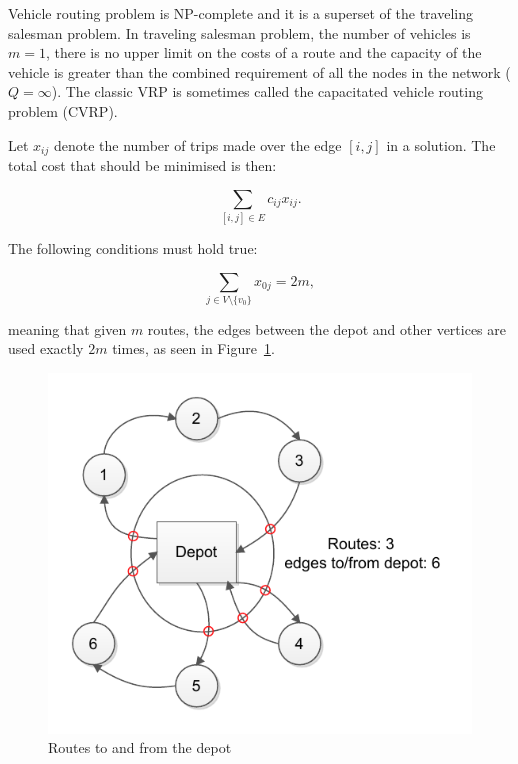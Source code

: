 Vehicle routing problem is NP-complete and it is a superset of the traveling salesman problem. In traveling salesman problem, the number of vehicles is $m = 1$, there is no upper limit on the costs of a route and the capacity of the vehicle is greater than the combined requirement of all the nodes in the network ($Q = \infty$). \cite{laporte2007you} The classic VRP is sometimes called the capacitated vehicle routing problem (CVRP). \cite{hassanzadeh2009location}

Let $x_{ij}$ denote the number of trips made over the edge $[i, j]$ in a solution. The total cost that should be minimised is then:

\begin{equation}
\label{eq:baseformula1}
\displaystyle \sum_{[i,j] \in E} c_{ij}x_{ij}.
\end{equation}

\noindent
The following conditions must hold true:

\begin{equation}
\label{eq:baseformula2}
\displaystyle \sum_{j \in V \setminus\{v_0\}} x_{0j} = 2m,
\end{equation}

\noindent
meaning that given $m$ routes, the edges between the depot and other vertices are used exactly $2m$ times, as seen in Figure~\ref{fig:basecond1}. \cite{laporte2007you}
\begin{figure}[h]
  \begin{center}
    \includegraphics{images/basecond1.pdf}
    \caption{Routes to and from the depot}
    \label{fig:basecond1}
  \end{center}
\end{figure}

